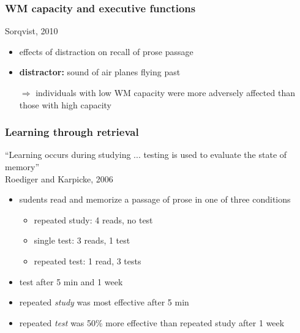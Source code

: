 \documentclass[]{beamer}
\begin{document}
\begin{frame}
 \frametitle{WM capacity and executive functions}
\begin{overlayarea}{110mm}{80mm}
 Sorqvist, 2010
\begin{itemize}
 \item effects of distraction on recall of prose passage
 \item \textbf{distractor:} sound of air planes flying past
 \item[$\Rightarrow$] individuals with low WM capacity were more adversely affected than those with high capacity 
\end{itemize}


\end{overlayarea}
\end{frame}



\begin{frame}
 \frametitle{Learning through retrieval}
\begin{overlayarea}{110mm}{70mm}
``Learning occurs during studying ... testing is used to evaluate the state of memory''\\
\vspace{2mm}
Roediger and Karpicke, 2006
\begin{itemize}
 \item sudents read and memorize a passage of prose in one of three conditions
 \begin{itemize}
  \item repeated study: 4 reads, no test
  \item single test: 3 reads, 1 test
  \item repeated test: 1 read, 3 tests
 \end{itemize}
 \item test after 5 min and 1 week
\item[]
 \item<2->[$\rightarrow$] repeated \textit{study} was most effective after 5 min
 \item<3->[$\rightarrow$] repeated \textit{test} was 50\% more effective than repeated study after 1 week
\end{itemize}
\end{overlayarea}
\end{frame}
\end{document}
